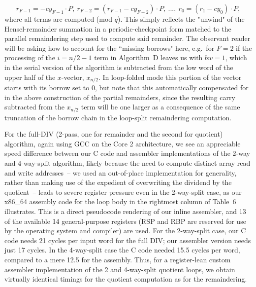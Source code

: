 \documentclass{article}
\begin{document}
\begin{equation}
r_{F-1} = -cy_{F-1}\cdot P,\ r_{F-2} = (r_{F-1}-cy_{F-2})\cdot P,\ ...,\ r_0 = (r_1-cy_0)\cdot P,
\label{algo_d_part}
\end{equation}
where all terms are computed (mod $q$). This simply reflects the "unwind" of the Hensel-remainder summation in a periodic-checkpoint form matched to the parallel remaindering step used to compute said remainder. The observant reader will be asking how to account for the ``missing borrows" here, e.g.~for $F=2$ if the processing of the $i=n/2-1$ term in Algorithm~D leaves us with $bw=1$, which in the serial version of the algorithm is subtracted from the low word of the upper half of the $x$-vector, $x_{n/2}$. In loop-folded mode this portion of the vector starts with its borrow set to 0, but note that this automatically compensated for in the above construction of the partial remainders, since the resulting carry subtracted from the $x_{n/2}$ term will be one larger as a consequence of the same truncation of the borrow chain in the loop-split remaindering computation.

For the full-DIV (2-pass, one for remainder and the second for quotient) algorithm, again using GCC on the Core 2 architecture, we see an appreciable speed difference between our C code and assembler implementations of the 2-way and 4-way-split algorithm, likely because the need to compute distinct array read and write addresses~-- we used an out-of-place implementation for generality, rather than making use of the expedient of overwriting the dividend by the quotient~-- leads to severe register pressure even in the 2-way-split case, as our x86\_64 assembly code for the loop body in the rightmost column of Table~6 illustrates. This is a direct pseudocode rendering of our inline assembler, and 13 of the available 14 general-purpose registers (RSP and RBP are reserved for use by the operating system and compiler) are used. For the 2-way-split case, our C code needs 21 cycles per input word for the full DIV; our assembler version needs just 17 cycles. In the 4-way-split case the C code needed 15.5 cycles per word, compared to a mere 12.5 for the assembly. Thus, for a register-lean custom assembler implementation of the 2 and 4-way-split quotient loops, we obtain virtually identical timings for the quotient computation as for the remaindering.
\end{document}
